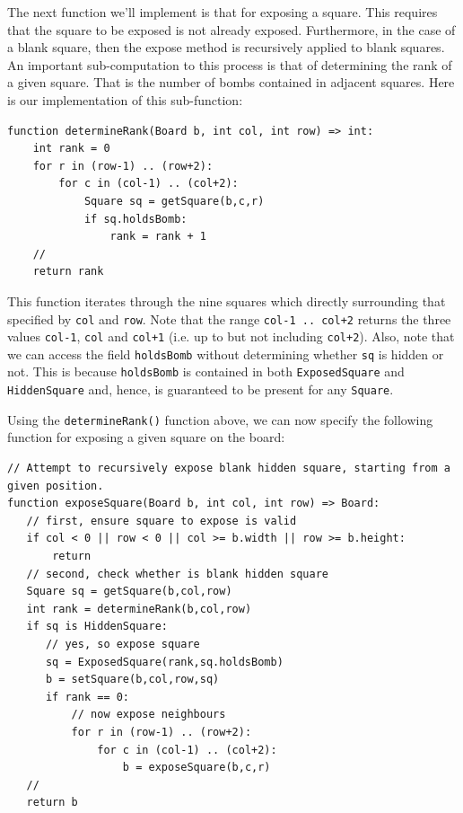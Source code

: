 The next function we'll implement is that for exposing a square.  This requires that the square to be exposed is not already exposed.  Furthermore, in the case of a blank square, then the expose method is recursively applied to blank squares.  An important sub-computation to this process is that of determining the rank of a given square.  That is the number of bombs contained in adjacent squares.  Here is our implementation of this sub-function:

\begin{lstlisting}
function determineRank(Board b, int col, int row) => int:
    int rank = 0
    for r in (row-1) .. (row+2):
        for c in (col-1) .. (col+2):
            Square sq = getSquare(b,c,r)
            if sq.holdsBomb:
                rank = rank + 1
    //
    return rank
\end{lstlisting}

This function iterates through the nine squares which directly surrounding that specified by \lstinline{col} and \lstinline{row}.  Note that the range \lstinline{col-1 .. col+2} returns the three values \lstinline{col-1}, \lstinline{col} and \lstinline{col+1} (i.e. up to but not including \lstinline{col+2}).  Also, note that we can access the field \lstinline{holdsBomb} without determining whether \lstinline{sq} is hidden or not.  This is because \lstinline{holdsBomb} is contained in both \lstinline{ExposedSquare} and \lstinline{HiddenSquare} and, hence, is guaranteed to be present for any \lstinline{Square}.

Using the \lstinline{determineRank()} function above, we can now specify the following function for exposing a given square on the board:

\begin{lstlisting}
// Attempt to recursively expose blank hidden square, starting from a given position.
function exposeSquare(Board b, int col, int row) => Board:
   // first, ensure square to expose is valid
   if col < 0 || row < 0 || col >= b.width || row >= b.height:
       return
   // second, check whether is blank hidden square
   Square sq = getSquare(b,col,row)
   int rank = determineRank(b,col,row)
   if sq is HiddenSquare:       
      // yes, so expose square
      sq = ExposedSquare(rank,sq.holdsBomb)
      b = setSquare(b,col,row,sq)
      if rank == 0:
          // now expose neighbours
          for r in (row-1) .. (row+2):
              for c in (col-1) .. (col+2):
                  b = exposeSquare(b,c,r)
   //
   return b
\end{lstlisting}

